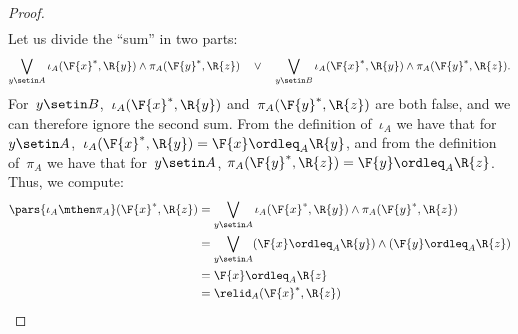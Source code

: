 \begin{proof}
\begin{equation}
\begin{aligned}
        \end{aligned}
    \end{equation}
    Let us divide the ``sum'' in two parts:
    \begin{equation}
        \bigvee_{y \setin A} \iota_A(\F{x}^*,\R{y}) \wedge \pi_A(\F{y}^*,\R{z}) \quad\vee\quad
        \bigvee_{y \setin B} \iota_A(\F{x}^*,\R{y}) \wedge \pi_A(\F{y}^*,\R{z}).
    \end{equation}
    For~$y \setin B$,~$\iota_A(\F{x}^*,\R{y})$ and~$\pi_A(\F{y}^*,\R{z})$ are both false, and we can therefore ignore the second sum.
    From the definition of~$\iota_A$ we have that for~$y\setin A$,~$ \iota_A(\F{x}^*,\R{y})=\F{x} \ordleq_A \R{y}$, and from the definition of~$\pi_A$ we have that for~$y\setin A$, $\pi_A(\F{y}^*,\R{z})=\F{y} \ordleq_A \R{z}$.
    Thus, we compute:
    \begin{equation}
        \begin{aligned}
            \pars{\iota_A\mthen \pi_A}(\F{x}^*, \R{z}) & = \bigvee_{y \setin A} \iota_A(\F{x}^*,\R{y}) \wedge \pi_A(\F{y}^*,\R{z}) \\
                                                       & = \bigvee_{y \setin A} (\F{x} \ordleq_A \R{y}) \wedge  (\F{y} \ordleq_A \R{z}) \\
                                                       & = \F{x} \ordleq_A \R{z} \\
                                                       & = \relid_A(\F{x}^*, \R{z})
        \end{aligned}
    \end{equation}
\end{proof}

